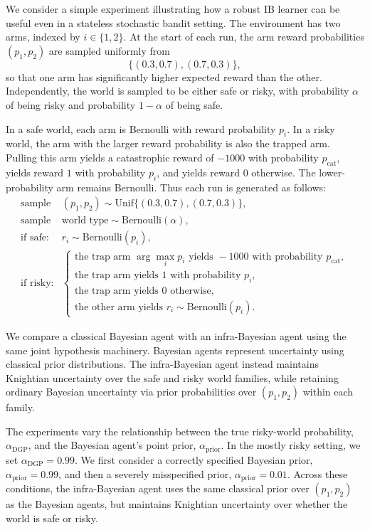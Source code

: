 
We consider a simple experiment illustrating how a robust IB learner can be useful even in a stateless stochastic bandit setting. The environment has two arms, indexed by \(i \in \{1,2\}\). At the start of each run, the arm reward probabilities \((p_1,p_2)\) are sampled uniformly from
\[
    \{(0.3,0.7), (0.7,0.3)\},
\]
so that one arm has significantly higher expected reward than the other. Independently, the world is sampled to be either safe or risky, with probability \(\alpha\) of being risky and probability \(1-\alpha\) of being safe.

In a safe world, each arm is Bernoulli with reward probability \(p_i\). In a risky world, the arm with the larger reward probability is also the trapped arm. Pulling this arm yields a catastrophic reward of \(-1000\) with probability \(p_{\mathrm{cat}}\), yields reward \(1\) with probability \(p_i\), and yields reward \(0\) otherwise. The lower-probability arm remains Bernoulli. Thus each run is generated as follows:
\[
\begin{array}{ll}
\text{sample} & (p_1,p_2) \sim \mathrm{Unif}\{(0.3,0.7),(0.7,0.3)\},\\
\text{sample} & \text{world type} \sim \mathrm{Bernoulli}(\alpha),\\[2mm]
\text{if safe:} & r_i \sim \mathrm{Bernoulli}(p_i),\\[1mm]
\text{if risky:} &
\begin{cases}
\text{the trap arm } \arg\max_i p_i \text{ yields } -1000 \text{ with probability } p_{\mathrm{cat}},\\
\text{the trap arm yields } 1 \text{ with probability } p_i,\\
\text{the trap arm yields } 0 \text{ otherwise},\\
\text{the other arm yields } r_i \sim \mathrm{Bernoulli}(p_i).
\end{cases}
\end{array}
\]

We compare a classical Bayesian agent with an infra-Bayesian agent using the same joint hypothesis machinery. Bayesian agents represent uncertainty using classical prior distributions. The infra-Bayesian agent instead maintains Knightian uncertainty over the safe and risky world families, while retaining ordinary Bayesian uncertainty via prior probabilities over \((p_1,p_2)\) within each family.

The experiments vary the relationship between the true risky-world probability, \(\alpha_{\mathrm{DGP}}\), and the Bayesian agent's point prior, \(\alpha_{\mathrm{prior}}\). In the mostly risky setting, we set \(\alpha_{\mathrm{DGP}}=0.99\). We first consider a correctly specified Bayesian prior, \(\alpha_{\mathrm{prior}}=0.99\), and then a severely misspecified prior, \(\alpha_{\mathrm{prior}}=0.01\). Across these conditions, the infra-Bayesian agent uses the same classical prior over \((p_1,p_2)\) as the Bayesian agents, but maintains Knightian uncertainty over whether the world is safe or risky.

